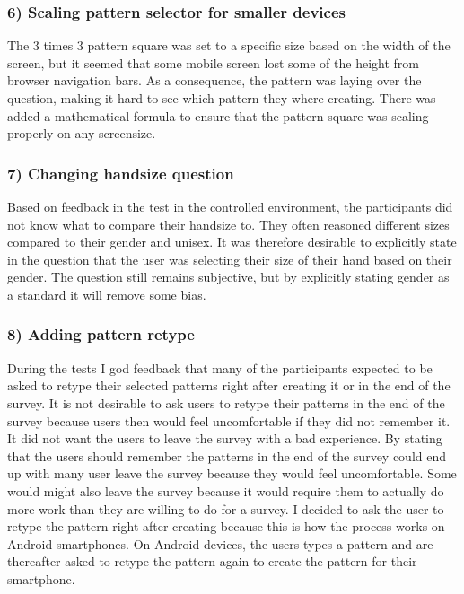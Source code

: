     \subsubsection*{6) Scaling pattern selector for smaller devices}
    The 3 times 3 pattern square was set to a specific size based on the width of the screen, but it seemed that some mobile screen lost some of the height from browser navigation bars. As a consequence, the pattern was laying over the question, making it hard to see which pattern they where creating. There was added a mathematical formula to ensure that the pattern square was scaling properly on any screensize. 
    
    \subsubsection*{7) Changing handsize question}
    Based on feedback in the test in the controlled environment, the participants did not know what to compare their handsize to. They often reasoned different sizes compared to their gender and unisex. It was therefore desirable to explicitly state in the question that the user was selecting their size of their hand based on their gender. The question still remains subjective, but by explicitly stating gender as a standard it will remove some bias. 
    
    \subsubsection*{8) Adding pattern retype}
    During the tests I god feedback that many of the participants expected to be asked to retype their selected patterns right after creating it or in the end of the survey. It is not desirable to ask users to retype their patterns in the end of the survey because users then would feel uncomfortable if they did not remember it. It did not want the users to leave the survey with a bad experience. By stating that the users should remember the patterns in the end of the survey could end up with many user leave the survey because they would feel uncomfortable. Some would might also leave the survey because it would require them to actually do more work than they are willing to do for a survey. I decided to ask the user to retype the pattern right after creating because this is how the process works on Android smartphones. On Android devices, the users types a pattern and are thereafter asked to retype the pattern again to create the pattern for their smartphone. 
    
